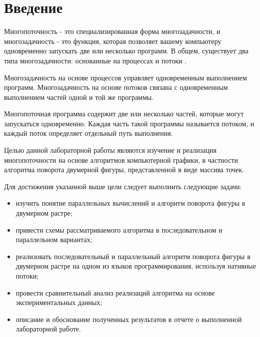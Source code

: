 \chapter*{Введение}

Многопоточность - это специализированная форма многозадачности, и многозадачность - это функция, которая позволяет вашему компьютеру одновременно запускать две или несколько программ. В общем, существует два типа многозадачности: основанные на процессах и потоки \cite{cpp_concurrency}.

Многозадачность на основе процессов управляет одновременным выполнением программ. Многозадачность на основе потоков связана с одновременным выполнением частей одной и той же программы.

Многопоточная программа содержит две или несколько частей, которые могут запускаться одновременно. Каждая часть такой программы называется потоком, и каждый поток определяет отдельный путь выполнения.


Целью данной лабораторной работы являются изучение и реализация многопоточности на основе алгоритмов компьютерной графики, в частности алгоритма поворота двумерной фигуры, представленной в виде массива точек.

Для достижения указанной выше цели следует выполнить следующие задачи:
\begin{itemize}
	\item изучить понятие параллельных вычислений и алгоритм поворота фигуры в двумерном растре;
	\item привести схемы рассматриваемого алгоритма в последовательном и параллельном вариантах;
	\item реализовать последовательный и параллельный алгоритм поворота фигуры в двумерном растре на одном из языков программирования, используя нативные потоки;
	\item провести сравнительный анализ реализаций алгоритма на основе экспериментальных данных;
	\item описание и обоснование полученных результатов в отчете о выполненной лабораторной работе.
\end{itemize}

